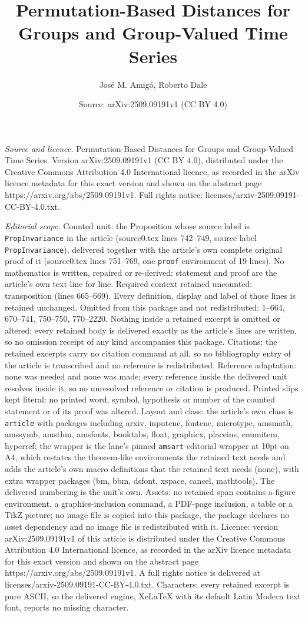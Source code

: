 \documentclass[10pt,a4paper]{amsart}
\title[Permutation-Based Distances for Groups and Group-Valued Time]{Permutation-Based Distances for Groups and Group-Valued Time Series}
\author{Jos\'e M. Amig\'o, Roberto Dale}
\date{Source: arXiv:2509.09191v1 (CC BY 4.0)}
\begin{document}
\maketitle

\noindent\emph{Source and licence.} Permutation-Based Distances for Groups and Group-Valued Time Series. Version arXiv:2509.09191v1 (CC BY 4.0), distributed under the Creative Commons Attribution 4.0 International licence, as recorded in the arXiv licence metadata for this exact version and shown on the abstract page https://arxiv.org/abs/2509.09191v1. Full rights notice: licenses/arxiv-2509.09191-CC-BY-4.0.txt.\par\smallskip

\noindent\textit{Editorial scope.} Counted unit: the Proposition whose source label is \texttt{PropInvariance} in the article (source0.tex lines 742--749, source label \texttt{PropInvariance}), delivered together with the article's own complete original proof of it (source0.tex lines 751--769, one \texttt{proof} environment of 19 lines). No mathematics is written, repaired or re-derived: statement and proof are the article's own text line for line. Required context retained uncounted: transposition (lines 665--669). Every definition, display and label of those lines is retained unchanged. Omitted from this package and not redistributed: 1--664, 670--741, 750--750, 770--2220. Nothing inside a retained excerpt is omitted or altered: every retained body is delivered exactly as the article's lines are written, so no omission receipt of any kind accompanies this package. Citations: the retained excerpts carry no citation command at all, so no bibliography entry of the article is transcribed and no reference is redistributed. Reference adaptation: none was needed and none was made; every reference inside the delivered unit resolves inside it, so no unresolved reference or citation is produced. Printed slips kept literal: no printed word, symbol, hypothesis or number of the counted statement or of its proof was altered. Layout and class: the article's own class is \texttt{article} with packages including arxiv, inputenc, fontenc, microtype, amsmath, amssymb, amsthm, amsfonts, booktabs, float, graphicx, placeins, enumitem, hyperref; the wrapper is the lane's pinned \texttt{amsart} editorial wrapper at 10pt on A4, which restates the theorem-like environments the retained text needs and adds the article's own macro definitions that the retained text needs (none), with extra wrapper packages (bm, bbm, dsfont, xspace, cancel, mathtools). The delivered numbering is the unit's own. Assets: no retained span contains a figure environment, a graphics-inclusion command, a PDF-page inclusion, a table or a TikZ picture; no image file is copied into this package, the package declares no asset dependency and no image file is redistributed with it. Licence: version arXiv:2509.09191v1 of this article is distributed under the Creative Commons Attribution 4.0 International licence, as recorded in the arXiv licence metadata for this exact version and shown on the abstract page https://arxiv.org/abs/2509.09191v1. A full rights notice is delivered at licenses/arxiv-2509.09191-CC-BY-4.0.txt. Characters: every retained excerpt is pure ASCII, so the delivered engine, XeLaTeX with its default Latin Modern text font, reports no missing character.
\end{document}
